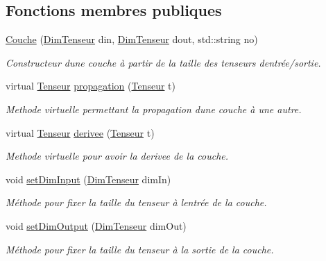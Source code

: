 \subsection*{Fonctions membres publiques}
\begin{DoxyCompactItemize}
\item 
\mbox{\label{classCouche_a6da95828f8c597f57aaac057b9357622}} 
\hyperlink{classCouche_a6da95828f8c597f57aaac057b9357622}{Couche} (\hyperlink{classDimTenseur}{Dim\+Tenseur} din, \hyperlink{classDimTenseur}{Dim\+Tenseur} dout, std\+::string no)
\begin{DoxyCompactList}\small\item\em Constructeur d\textquotesingle{}une couche à partir de la taille des tenseurs d\textquotesingle{}entrée/sortie. \end{DoxyCompactList}\item 
virtual \hyperlink{classTenseur}{Tenseur} \hyperlink{classCouche_a1f0ed59e21020f5d4f37933af4d1b1e5}{propagation} (\hyperlink{classTenseur}{Tenseur} t)
\begin{DoxyCompactList}\small\item\em Methode virtuelle permettant la propagation d\textquotesingle{}une couche à une autre. \end{DoxyCompactList}\item 
virtual \hyperlink{classTenseur}{Tenseur} \hyperlink{classCouche_acfb65d035c2070d65b699508b7333bb3}{derivee} (\hyperlink{classTenseur}{Tenseur} t)
\begin{DoxyCompactList}\small\item\em Methode virtuelle pour avoir la derivee de la couche. \end{DoxyCompactList}\item 
void \hyperlink{classCouche_ab24ce01bc6fb7b903013f7682ce60a7e}{set\+Dim\+Input} (\hyperlink{classDimTenseur}{Dim\+Tenseur} dim\+In)
\begin{DoxyCompactList}\small\item\em Méthode pour fixer la taille du tenseur à l\textquotesingle{}entrée de la couche. \end{DoxyCompactList}\item 
void \hyperlink{classCouche_a9af2f37eaf1063cb05abe980cfaa4cce}{set\+Dim\+Output} (\hyperlink{classDimTenseur}{Dim\+Tenseur} dim\+Out)
\begin{DoxyCompactList}\small\item\em Méthode pour fixer la taille du tenseur à la sortie de la couche. \end{DoxyCompactList}\item 

\end{DoxyCompactItemize}
